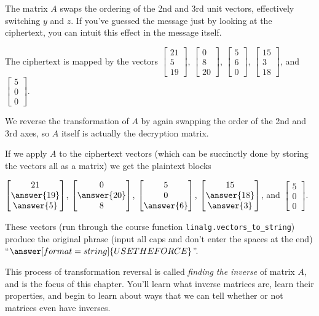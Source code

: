 \documentclass{ximera}
\begin{document}
\begin{solution}
  The matrix $A$ swaps the ordering of the 2nd and 3rd unit vectors, effectively switching $y$ and $z$. If you've guessed the message just by looking at the ciphertext, you can intuit this effect in the message itself.

  The ciphertext is mapped by the vectors $\begin{bmatrix}
    21 \\5\\19\end{bmatrix}$, $\begin{bmatrix}
    0 \\8\\20 \end{bmatrix}$, $\begin{bmatrix}
    5\\6\\0\end{bmatrix}$, $\begin{bmatrix}
    15\\3\\18\end{bmatrix}$, and $\begin{bmatrix}
    5\\0\\0\end{bmatrix}$.

  We reverse the transformation of $A$ by again swapping the order of the 2nd and 3rd axes, so $A$ itself is actually the decryption matrix.

  If we apply $A$ to the ciphertext vectors (which can be succinctly done by storing the vectors all as a matrix) we get the plaintext blocks 

  $\begin{bmatrix}
    21 \\
    \answer{19}\\
    \answer{5}\end{bmatrix}$, 
    $\begin{bmatrix}
    0 \\
    \answer{20}
    \\8\end{bmatrix}$, 
    $\begin{bmatrix}
    5\\0\\
    \answer{6}\end{bmatrix}$, 
    $\begin{bmatrix}
    15\\
    \answer{18}\\
    \answer{3}\end{bmatrix}$, 
    and $\begin{bmatrix}
    5\\0\\0\end{bmatrix}$.

  These vectors (run through the course function \texttt{linalg.vectors\_to\_string}) produce the original phrase (input all caps and don't enter the spaces at the end) ``$\answer[format=string]{USE THE FORCE}$''.

\end{solution}

This process of transformation reversal is called \emph{finding the inverse} of matrix $A$, and is the focus of this chapter. You'll learn what inverse matrices are, learn their properties, and begin to learn about ways that we can tell whether or not matrices even have inverses.
\end{document}
